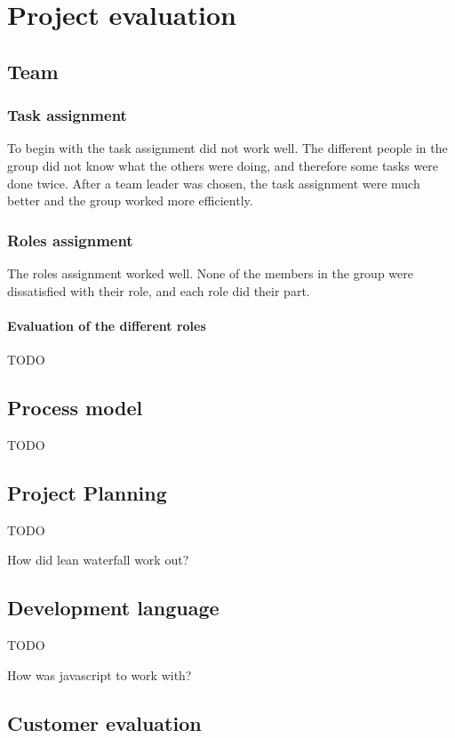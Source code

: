\chapter{Project evaluation}

\section{Team}

\subsection*{Task assignment}
To begin with the task assignment did not work well. The different people in 
the group did not know what the others were doing, and therefore some tasks were done twice.
After a team leader was chosen, the task assignment were much better and the group worked more efficiently. 

\subsection*{Roles assignment}
The roles assignment worked well. None of the members in the group were dissatisfied with their role, and each role
did their part.

\subsubsection{Evaluation of the different roles}
TODO


\section{Process model}
TODO
\section{Project Planning}
TODO

How did lean waterfall work out?

\section{Development language}
TODO

How was javascript to work with?


\section{Customer evaluation}

